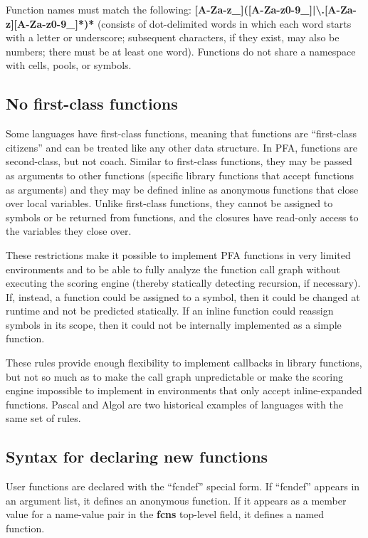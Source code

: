 \documentclass{article}
\newcommand{\PFAc}{\ttfamily\bfseries}
\theoremstyle{definition}
\begin{document}
Function names must match the following: {\PFAc [A-Za-z\_]([A-Za-z0-9\_]|\textbackslash.[A-Za-z][A-Za-z0-9\_]*)*} (consists of dot-delimited words in which each word starts with a letter or underscore; subsequent characters, if they exist, may also be numbers; there must be at least one word).  Functions do not share a namespace with cells, pools, or symbols.

\subsection{No first-class functions}

Some languages have first-class functions, meaning that functions are ``first-class citizens'' and can be treated like any other data structure.  In PFA, functions are second-class, but not coach.  Similar to first-class functions, they may be passed as arguments to other functions (specific library functions that accept functions as arguments) and they may be defined inline as anonymous functions that close over local variables.  Unlike first-class functions, they cannot be assigned to symbols or be returned from functions, and the closures have read-only access to the variables they close over.

These restrictions make it possible to implement PFA functions in very limited environments and to be able to fully analyze the function call graph without executing the scoring engine (thereby statically detecting recursion, if necessary).  If, instead, a function could be assigned to a symbol, then it could be changed at runtime and not be predicted statically.  If an inline function could reassign symbols in its scope, then it could not be internally implemented as a simple function.

These rules provide enough flexibility to implement callbacks in library functions, but not so much as to make the call graph unpredictable or make the scoring engine impossible to implement in environments that only accept inline-expanded functions.  Pascal and Algol are two historical examples of languages with the same set of rules.

\subsection{Syntax for declaring new functions}

User functions are declared with the ``fcndef'' special form.  If ``fcndef'' appears in an argument list, it defines an anonymous function.  If it appears as a member value for a name-value pair in the {\PFAc fcns} top-level field, it defines a named function.
\end{document}
